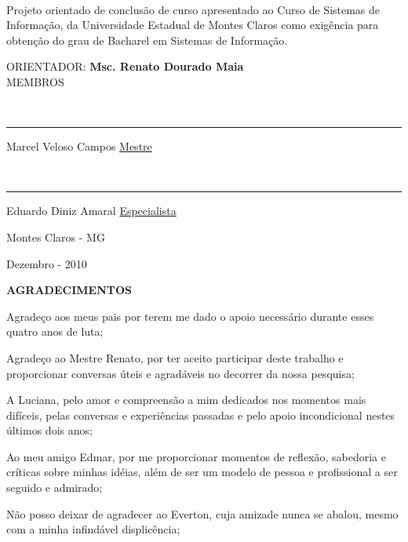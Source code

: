 \documentclass[a4paper,12pt]{report}
\begin{document}
	\ \\[1cm]

\begin{flushright}
	\begin{small}
		\parbox{200pt}{Projeto orientado de conclusão de curso apresentado ao Curso de Sistemas de Informação,	da Universidade Estadual de Montes Claros como exigência para obtenção do grau de Bacharel	em Sistemas de Informação.}
		
	\end{small}
\end{flushright}


\begin{center}


	ORIENTADOR: \textbf{Msc. Renato Dourado Maia}
	\ \\[2cm]
	MEMBROS

	\ \\[1cm]
	\hrule
	Marcel Veloso Campos \underline{Mestre}

	\ \\[1cm]
	\hrule
	Eduardo Diniz Amaral \underline{Especialista}

\end{center}

\begin{center}	
	\vfill
	Montes Claros - MG
	
	Dezembro - 2010 
\end{center}

\pagebreak
\addtocounter{page}{-1}
\thispagestyle{empty}
\begin{center}
\textbf{AGRADECIMENTOS}
\end{center}

Agradeço aos meus pais por terem me dado o apoio necessário durante esses quatro anos de luta;

Agradeço ao Mestre Renato, por ter aceito participar deste trabalho e proporcionar conversas úteis e agradáveis no decorrer da nossa pesquisa;

A Luciana, pelo amor e compreensão a mim dedicados nos momentos mais difíceis, pelas conversas e experiências passadas e pelo apoio incondicional nestes últimos dois anos;

Ao meu amigo Edmar, por me proporcionar momentos de reflexão, sabedoria e críticas sobre minhas idéias, além de ser um modelo de pessoa e profissional a ser seguido e admirado;

Não posso deixar de agradecer ao Everton, cuja amizade nunca se abalou, mesmo com a minha infindável displicência;
\end{document}
